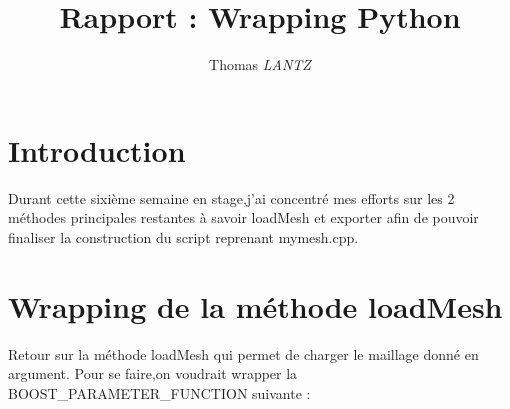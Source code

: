 \documentclass[12pt]{article}
\title {Rapport : Wrapping Python}
\author {Thomas \emph{LANTZ}}
\begin{document}
\maketitle 

\section{Introduction}

Durant cette sixième semaine en stage,j'ai concentré mes efforts sur les 2 méthodes principales restantes à savoir loadMesh et exporter afin de pouvoir finaliser la construction du script reprenant mymesh.cpp.


\section{Wrapping de la méthode loadMesh}

Retour sur la méthode loadMesh qui permet de charger le maillage donné en argument. Pour se faire,on voudrait wrapper la BOOST\_PARAMETER\_FUNCTION suivante :
\end{document}
